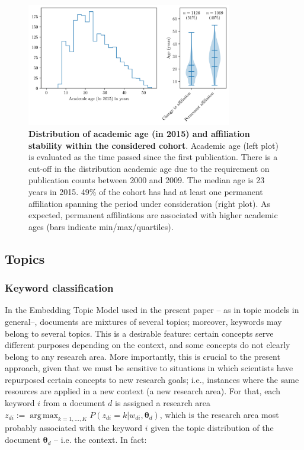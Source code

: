 \documentclass{article}
\DeclareMathOperator*{\argmax}{arg\,max}
\begin{document}
\begin{figure}[H]
    \centering
    \includegraphics[width=0.8\textwidth]{Fig9.png}
    \caption{\textbf{Distribution of academic age (in 2015) and affiliation stability within the considered cohort}.  Academic age (left plot) is evaluated as the time passed since the first publication. There is a cut-off in the distribution academic age due to the requirement on publication counts between 2000 and 2009. The median age is 23 years in 2015. 49\% of the cohort has had at least one permanent affiliation spanning the period under consideration (right plot). As expected, permanent affiliations are associated with higher academic ages (bars indicate min/max/quartiles). }
    \label{fig:sample_characteristics}
\end{figure}

\subsection{\label{appendix:topics}Topics}

\subsubsection{\label{appendix:keywords}Keyword classification}

In the Embedding Topic Model used in the present paper -- as in topic models in general--, documents are mixtures of several topics; moreover, keywords may belong to several topics. This is a desirable feature: certain concepts serve different purposes depending on the context, and some concepts do not clearly belong to any research area. More importantly, this is crucial to the present approach, given that we must be sensitive to situations in which scientists have repurposed certain concepts to new research goals; i.e., instances where the same resources are applied in a new context (a new research area).
For that, each keyword $i$ from a document $d$ is assigned a research area $z_{di} := \argmax_{k=1,\dots,K} P(z_{di}=k|w_{di},\bm{\theta}_{d})$, which is the research area most probably associated with the keyword $i$ given the topic distribution of the document $\bm{\theta}_d$ -- i.e. the context. In fact:
\end{document}
